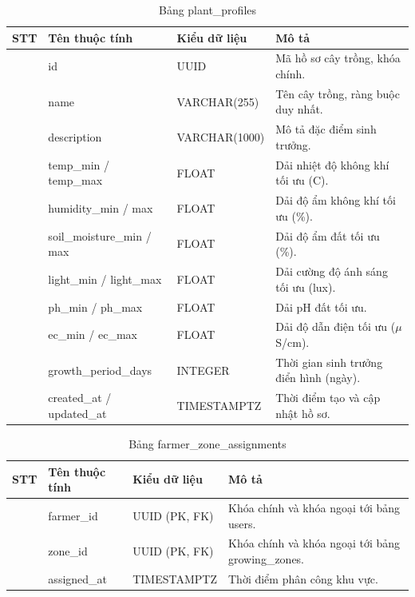 \documentclass[13pt,a4paper]{extarticle}
\numberwithin{figure}{section}
\numberwithin{table}{section}
\begin{document}
	\begin{table}[H]
		\centering
		\caption{Bảng plant\_profiles}
		\label{tab:plant_profiles}
		\begingroup
		\setlength{\tabcolsep}{3pt}
		\begin{tabularx}{\textwidth}{|>{\centering\arraybackslash}p{1cm}|>{\raggedright\arraybackslash}p{3.8cm}|>{\raggedright\arraybackslash}p{3.2cm}|Y|}
			\hline
			\centering\textbf{STT} & \centering\textbf{Tên thuộc tính} & \centering\textbf{Kiểu dữ liệu} & \centering\arraybackslash\textbf{Mô tả} \\
			 & id & UUID & Mã hồ sơ cây trồng, khóa chính. \\
			 & name & VARCHAR(255) & Tên cây trồng, ràng buộc duy nhất. \\
			 & description & VARCHAR(1000) & Mô tả đặc điểm sinh trưởng. \\
			 & temp\_min / temp\_max & FLOAT & Dải nhiệt độ không khí tối ưu (\textdegree C). \\
			 & humidity\_min / max & FLOAT & Dải độ ẩm không khí tối ưu (\%). \\
			 & soil\_moisture\_min / max & FLOAT & Dải độ ẩm đất tối ưu (\%). \\
			 & light\_min / light\_max & FLOAT & Dải cường độ ánh sáng tối ưu (lux). \\
			 & ph\_min / ph\_max & FLOAT & Dải pH đất tối ưu. \\
			 & ec\_min / ec\_max & FLOAT & Dải độ dẫn điện tối ưu ($\mu$S/cm). \\
			 & growth\_period\_days & INTEGER & Thời gian sinh trưởng điển hình (ngày). \\
			 & created\_at / updated\_at & TIMESTAMPTZ & Thời điểm tạo và cập nhật hồ sơ. \\
			\hline
		\end{tabularx}
		\endgroup
	\end{table}
	
	\begin{table}[H]
		\centering
		\caption{Bảng farmer\_zone\_assignments}
		\label{tab:farmer_zone_assignments}
		\begingroup
		\setlength{\tabcolsep}{3pt}
		\begin{tabularx}{\textwidth}{|>{\centering\arraybackslash}p{1cm}|>{\raggedright\arraybackslash}p{3.8cm}|>{\raggedright\arraybackslash}p{3.2cm}|Y|}
			\hline
			\centering\textbf{STT} & \centering\textbf{Tên thuộc tính} & \centering\textbf{Kiểu dữ liệu} & \centering\arraybackslash\textbf{Mô tả} \\
			 & farmer\_id & UUID (PK, FK) & Khóa chính và khóa ngoại tới bảng users. \\
			 & zone\_id & UUID (PK, FK) & Khóa chính và khóa ngoại tới bảng growing\_zones. \\
			 & assigned\_at & TIMESTAMPTZ & Thời điểm phân công khu vực. \\
			\hline
		\end{tabularx}
		\endgroup
	\end{table}
	
\end{document}
